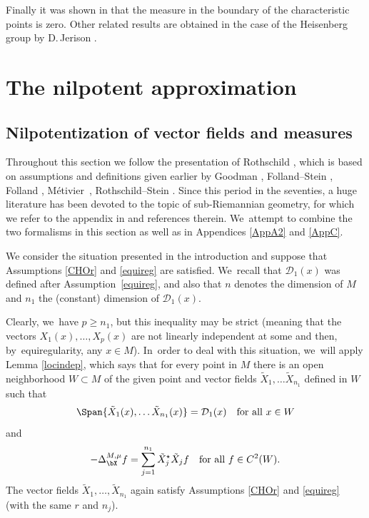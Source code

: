 Finally it was shown in \cite{De} that the measure in the boundary of the characteristic points is zero. Other related results are obtained in the case of the Heisenberg group by D.\,Jerison \cite{Jer}.

\section{The nilpotent approximation}\label{s1}

\subsection{Nilpotentization of vector fields and measures}
Throughout this section we follow the presentation of Rothschild \cite{Rot}, which is based on assumptions and definitions given earlier by Goodman \cite{Go}, Folland--Stein \cite{FS}, Folland \cite{Fo}, Métivier~\cite{Me}, Rothschild--Stein \cite{RS}. Since this period in the seventies, a huge literature has been devoted to the topic of sub-Riemannian geometry, for which we refer to the appendix in \cite{CHT} and references therein. We~attempt to combine the two formalisms in this section as well as in Appendices \ref{AppA2} and \ref{AppC}.

We consider the situation presented in the introduction and suppose that Assumptions \ref{CHOr} and \ref{equireg} are satisfied. We~recall that $\mathcal D_1(x)$ was defined after Assumption~\ref{equireg}, and also that $n$ denotes the dimension of $M$ and $n_1$ the (constant) dimension of $\mathcal D_1(x)$.

Clearly, we~have $p\geq n_1$, but this inequality may be strict (meaning that the vectors $X_1(x),\ldots,X_p(x)$ are not linearly independent at some and then, by~equiregularity, any $x\in M$). In~order to deal with this situation, we~will apply Lemma \ref{locindep}, which says that for every point in $M$ there is an open neighborhood $W\subset M$ of the given point and vector fields $\tilde X_1,\ldots \tilde X_{n_1}$ defined in $W$ such that
\begin{equation}
\label{eq:loclinindep}
\Span\{ \tilde X_1(x),\ldots \tilde X_{n_1}(x) \} = \mathcal D_1(x)
\quad\text{for all}\ x\in W
\end{equation}
and
\begin{equation}
\label{eq:loclinindeplapl}
-\Delta_\bX^{M,\mu} f = \sum_{j=1}^{n_1} \tilde X_j^\star \tilde X_j f
\quad\text{for all} \ f\in C^2(W).
\end{equation}
The vector fields $\tilde X_1,\ldots,\tilde X_{n_1}$ again satisfy Assumptions \ref{CHOr} and \ref{equireg} (with the same $r$ and $n_j$).

